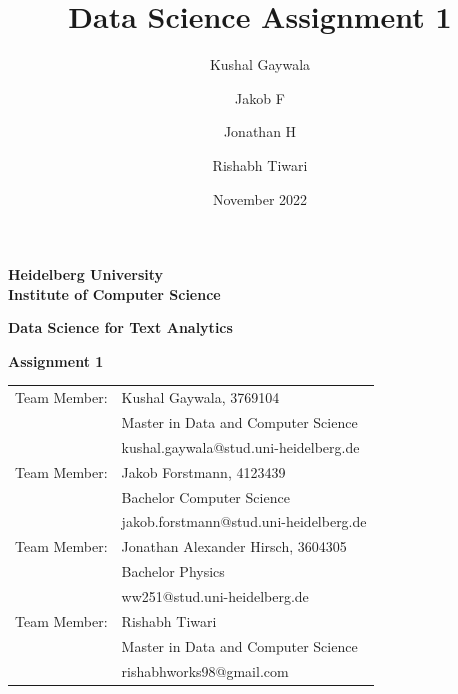 \documentclass{article}
\begin{document}
\begin{titlepage}

\title{Data Science Assignment 1}
\author[1]{Kushal Gaywala}
\author[2]{Jakob F}
\author[3]{Jonathan H}
\author[4]{Rishabh Tiwari}
\date{November 2022}

\begin{center}
\textbf{ 
\LARGE Heidelberg University\\
\smallskip
\Large Institute of Computer Science\\
\smallskip
}

\vspace{3cm}

\textbf{\Large Data Science for Text Analytics}

\vspace{1\baselineskip}
{\huge
\textbf{Assignment 1}
}
\end{center}

\vspace{3cm}

{\large
\begin{tabular}[l]{ll}
Team Member: &Kushal Gaywala, 3769104\\ & Master in Data and Computer Science \\ &
   kushal.gaywala@stud.uni-heidelberg.de\\
Team Member: &Jakob Forstmann, 4123439\\ &Bachelor Computer Science\\ &
    jakob.forstmann@stud.uni-heidelberg.de\\
Team Member: & Jonathan Alexander Hirsch, 3604305\\
  & Bachelor Physics \\ & ww251@stud.uni-heidelberg.de\\
Team Member: &Rishabh Tiwari\\ & Master in Data and Computer Science \\ & rishabhworks98@gmail.com\\
\end{tabular}
}

\end{titlepage}
\large
\end{document}
